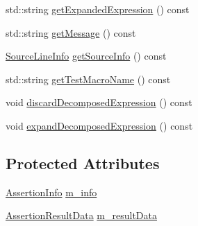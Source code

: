 \begin{DoxyCompactItemize}
\item 
std\-::string \hyperlink{classCatch_1_1AssertionResult_a675d074588875eb62b0b6e36e05d65e6}{get\-Expanded\-Expression} () const 
\item 
std\-::string \hyperlink{classCatch_1_1AssertionResult_a9793bfc4d24678c8a013bda84a5aa905}{get\-Message} () const 
\item 
\hyperlink{structCatch_1_1SourceLineInfo}{Source\-Line\-Info} \hyperlink{classCatch_1_1AssertionResult_a68b73fe982a97fe6432af679af1a2dad}{get\-Source\-Info} () const 
\item 
std\-::string \hyperlink{classCatch_1_1AssertionResult_a2901d41b199258ff6a44571b147169dd}{get\-Test\-Macro\-Name} () const 
\item 
void \hyperlink{classCatch_1_1AssertionResult_a99ab3067eb758c3fecdee8d8ff2beae6}{discard\-Decomposed\-Expression} () const 
\item 
void \hyperlink{classCatch_1_1AssertionResult_a53e8c2ce444fc9353a4e54c9233ef527}{expand\-Decomposed\-Expression} () const 
\end{DoxyCompactItemize}
\subsection*{Protected Attributes}
\begin{DoxyCompactItemize}
\item 
\hyperlink{structCatch_1_1AssertionInfo}{Assertion\-Info} \hyperlink{classCatch_1_1AssertionResult_a3e7236f73a51d6fc8bb9dfdefcee7772}{m\-\_\-info}
\item 
\hyperlink{structCatch_1_1AssertionResultData}{Assertion\-Result\-Data} \hyperlink{classCatch_1_1AssertionResult_add3455b8bbedb0d643e18da67c66b4f7}{m\-\_\-result\-Data}
\end{DoxyCompactItemize}


